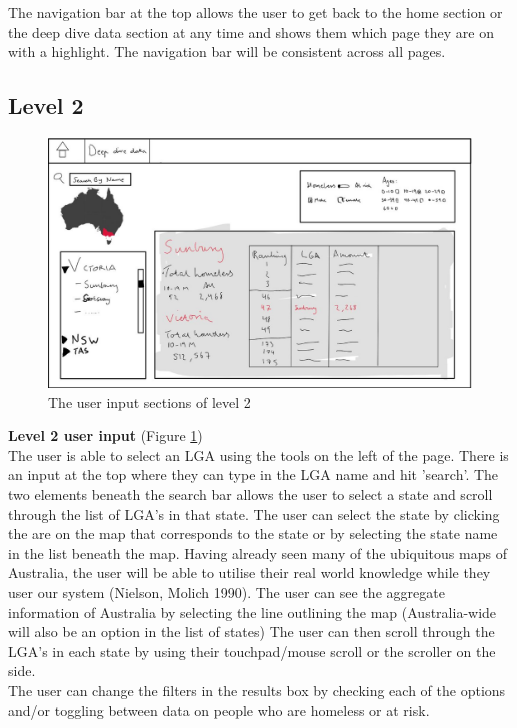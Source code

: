 \documentclass[12pt, a4paper]{article}
\begin{document}
The navigation bar at the top allows the user to get back to the home section or the deep dive data section at any time and shows them which page they are on with a highlight. The navigation bar will be consistent across all pages.

\subsection{Level 2}
\begin{figure}[h]
\centering
\includegraphics[scale=.6]{level2outer.png} 
\caption{The user input sections of level 2}
\label{fig:2outer}
\end{figure}
\textbf{Level 2 user input} (Figure \ref{fig:2outer}) \\
The user is able to select an LGA using the tools on the left of the page. There is an input at the top where they can type in the LGA name and hit 'search'. The two elements beneath the search bar allows the user to select a state and scroll through the list of LGA's in that state. The user can select the state by clicking the are on the map that corresponds to the state or by selecting the state name in the list beneath the map. Having already seen many of the ubiquitous maps of Australia, the user will be able to utilise their real world knowledge while they user our system  (Nielson, Molich 1990). The user can see the aggregate information of Australia by selecting the line outlining the map (Australia-wide will also be an option in the list of states) The user can then scroll through the LGA's in each state by using their touchpad/mouse scroll or the scroller on the side. \\
The user can change the filters in the results box by checking each of the options and/or toggling between data on people who are homeless or at risk. 
\end{document}
